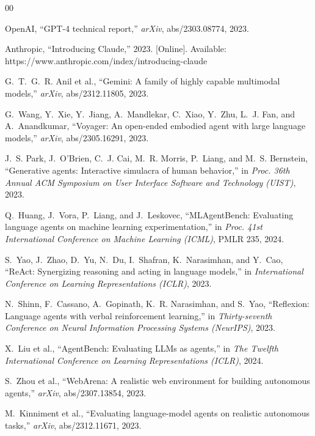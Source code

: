 \documentclass[conference]{IEEEtran}
\begin{document}
\begin{thebibliography}{00}

OpenAI, ``GPT-4 technical report,'' \textit{arXiv}, abs/2303.08774, 2023.

Anthropic, ``Introducing Claude,'' 2023. [Online]. Available:
https://www.anthropic.com/index/introducing-claude

G.~T.~G.~R. Anil et al., ``Gemini: A family of highly capable multimodal
models,'' \textit{arXiv}, abs/2312.11805, 2023.

G.~Wang, Y.~Xie, Y.~Jiang, A.~Mandlekar, C.~Xiao, Y.~Zhu, L.~J. Fan, and
A.~Anandkumar, ``Voyager: An open-ended embodied agent with large language
models,'' \textit{arXiv}, abs/2305.16291, 2023.

J.~S. Park, J.~O'Brien, C.~J. Cai, M.~R. Morris, P.~Liang, and
M.~S. Bernstein, ``Generative agents: Interactive simulacra of human
behavior,'' in \textit{Proc. 36th Annual ACM Symposium on User Interface
Software and Technology (UIST)}, 2023.

Q.~Huang, J.~Vora, P.~Liang, and J.~Leskovec, ``MLAgentBench: Evaluating
language agents on machine learning experimentation,'' in \textit{Proc. 41st
International Conference on Machine Learning (ICML)}, PMLR 235, 2024.

S.~Yao, J.~Zhao, D.~Yu, N.~Du, I.~Shafran, K.~Narasimhan, and Y.~Cao,
``ReAct: Synergizing reasoning and acting in language models,'' in
\textit{International Conference on Learning Representations (ICLR)}, 2023.

N.~Shinn, F.~Cassano, A.~Gopinath, K.~R. Narasimhan, and S.~Yao,
``Reflexion: Language agents with verbal reinforcement learning,'' in
\textit{Thirty-seventh Conference on Neural Information Processing
Systems (NeurIPS)}, 2023.

X.~Liu et al., ``AgentBench: Evaluating LLMs as agents,'' in \textit{The
Twelfth International Conference on Learning Representations (ICLR)}, 2024.

S.~Zhou et al., ``WebArena: A realistic web environment for building autonomous
agents,'' \textit{arXiv}, abs/2307.13854, 2023.

M.~Kinniment et al., ``Evaluating language-model agents on realistic autonomous
tasks,'' \textit{arXiv}, abs/2312.11671, 2023.


\end{thebibliography}
\end{document}
